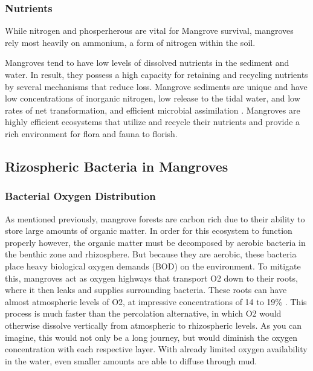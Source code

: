 \subsubsection{Nutrients}
While nitrogen and phosperherous are vital for Mangrove survival, mangroves rely most heavily on ammonium, a form of nitrogen within the soil. 

Mangroves tend to have low levels of dissolved nutrients in the sediment and water. In result, they possess a high capacity for retaining and recycling nutrients by several mechanisms that reduce loss. Mangrove sediments are unique and have low concentrations of inorganic nitrogen, low release to the tidal water, and low rates of net transformation, and efficient microbial assimilation \citep{kristensen2000carbon}. Mangroves are highly efficient ecosystems that utilize and recycle their nutrients and provide a rich environment for flora and fauna to florish. 



\subsection{Rizospheric Bacteria in Mangroves}

\subsubsection{Bacterial Oxygen Distribution}

  As mentioned previously, mangrove forests are carbon rich due to their ability to store large amounts of organic matter. In order for this ecosystem to function properly however, the organic matter must be decomposed by aerobic bacteria in the benthic zone and rhizosphere. But because they are aerobic, these bacteria place heavy biological oxygen demands (BOD) on the environment. To mitigate this, mangroves act as oxygen highways that transport O2 down to their roots, where it then leaks and supplies surrounding bacteria. These roots can have almost atmospheric levels of O2, at impressive concentrations of 14 to 19\% \citep{scholander1955micro}. This process is much faster than the percolation alternative, in which O2 would otherwise dissolve vertically from atmospheric to rhizospheric levels. As you can imagine, this would not only be a long journey, but would diminish the oxygen concentration with each respective layer. With already limited oxygen availability in the water, even smaller amounts are able to diffuse through mud. %
  

